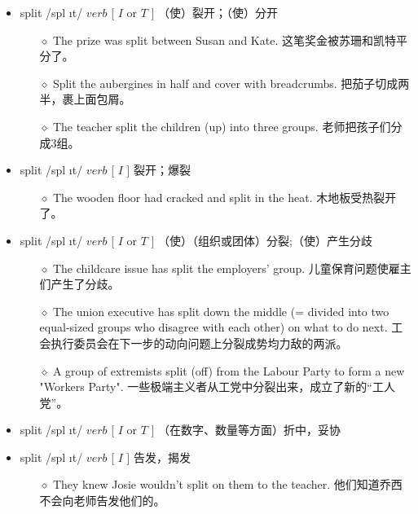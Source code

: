 \documentclass[a4paper,top=2.5cm,buttom=2.5cm10.5pt]{book}
\begin{document}
\begin{itemize}
\item split /spl \i t/ $ verb $ [  $ I $  or  $ T $  ] （使）裂开；（使）分开
\begin{itemize}
\item[$\diamond$] The prize was split between Susan and Kate.
这笔奖金被苏珊和凯特平分了。
\item[$\diamond$] Split the aubergines in half and cover with breadcrumbs.
把茄子切成两半，裹上面包屑。
\item[$\diamond$] The teacher split the children (up) into three groups.
老师把孩子们分成3组。
\end{itemize}
\end{itemize}
\begin{itemize}
\item split /spl \i t/ $ verb $ [  $ I $  ] 裂开；爆裂
\begin{itemize}
\item[$\diamond$] The wooden floor had cracked and split in the heat.
木地板受热裂开了。
\end{itemize}
\end{itemize}
\begin{itemize}
\item split /spl \i t/ $ verb $ [  $ I $  or  $ T $  ] （使）（组织或团体）分裂;（使）产生分歧
\begin{itemize}
\item[$\diamond$] The childcare issue has split the employers' group.
儿童保育问题使雇主们产生了分歧。
\item[$\diamond$] The union executive has split down the middle (= divided into two equal-sized groups who disagree with each other) on what to do next.
工会执行委员会在下一步的动向问题上分裂成势均力敌的两派。
\item[$\diamond$] A group of extremists split (off) from the Labour Party to form a new "Workers Party".
一些极端主义者从工党中分裂出来，成立了新的“工人党”。
\end{itemize}
\end{itemize}
\begin{itemize}
\item split /spl \i t/ $ verb $ [  $ I $  or  $ T $  ] （在数字、数量等方面）折中，妥协
\end{itemize}
\begin{itemize}
\item split /spl \i t/ $ verb $ [  $ I $  ] 告发，揭发
\begin{itemize}
\item[$\diamond$] They knew Josie wouldn't split on them to the teacher.
他们知道乔西不会向老师告发他们的。
\end{itemize}
\end{itemize}
\end{document}
